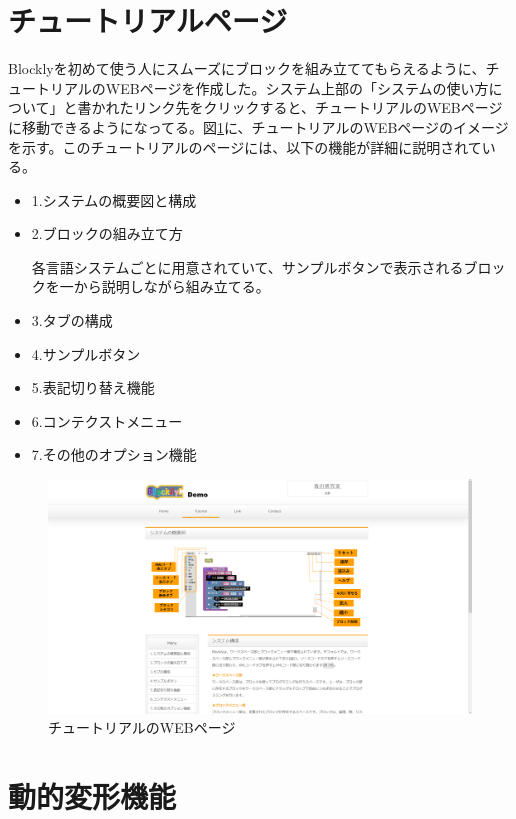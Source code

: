 \documentclass{risepaper}
\begin{document}
   \section{チュートリアルページ}
   
Blocklyを初めて使う人にスムーズにブロックを組み立ててもらえるように、チュートリアルのWEBページを作成した。システム上部の「システムの使い方について」と書かれたリンク先をクリックすると、チュートリアルのWEBページに移動できるようになってる。図\ref{fig:tutorial}に、チュートリアルのWEBページのイメージを示す。このチュートリアルのページには、以下の機能が詳細に説明されている。
\begin{itemize}
\item 1.システムの概要図と構成
\item 2.ブロックの組み立て方

各言語システムごとに用意されていて、サンプルボタンで表示されるブロックを一から説明しながら組み立てる。
\item 3.タブの構成
\item 4.サンプルボタン
\item 5.表記切り替え機能
\item 6.コンテクストメニュー
\item 7.その他のオプション機能
\end{itemize} 

\begin{figure}[h]
\begin{center}
\includegraphics[scale=0.5]{img/tutorial.PNG}
\caption{チュートリアルのWEBページ}%
\label{fig:tutorial}
\end{center}%
\end{figure}%


   \section{動的変形機能}
   
\end{document}
